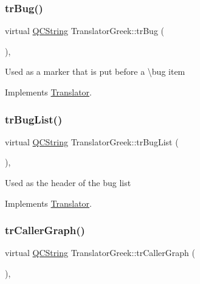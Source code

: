 \subsubsection{\texorpdfstring{trBug()}{trBug()}}
{\footnotesize\ttfamily virtual \mbox{\hyperlink{class_q_c_string}{Q\+C\+String}} Translator\+Greek\+::tr\+Bug (\begin{DoxyParamCaption}{ }\end{DoxyParamCaption})\hspace{0.3cm}{\ttfamily [inline]}, {\ttfamily [virtual]}}

Used as a marker that is put before a \textbackslash{}bug item 

Implements \mbox{\hyperlink{class_translator}{Translator}}.

\mbox{\label{class_translator_greek_ad4bae874aef6051ba63c5766391adf09}} 
\subsubsection{\texorpdfstring{trBugList()}{trBugList()}}
{\footnotesize\ttfamily virtual \mbox{\hyperlink{class_q_c_string}{Q\+C\+String}} Translator\+Greek\+::tr\+Bug\+List (\begin{DoxyParamCaption}{ }\end{DoxyParamCaption})\hspace{0.3cm}{\ttfamily [inline]}, {\ttfamily [virtual]}}

Used as the header of the bug list 

Implements \mbox{\hyperlink{class_translator}{Translator}}.

\mbox{\label{class_translator_greek_aeee0da136977509024184c1bd8a138e3}} 
\subsubsection{\texorpdfstring{trCallerGraph()}{trCallerGraph()}}
{\footnotesize\ttfamily virtual \mbox{\hyperlink{class_q_c_string}{Q\+C\+String}} Translator\+Greek\+::tr\+Caller\+Graph (\begin{DoxyParamCaption}{ }\end{DoxyParamCaption})\hspace{0.3cm}{\ttfamily [inline]}, {\ttfamily [virtual]}}


